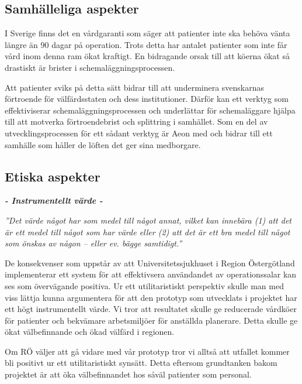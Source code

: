 \subsection{Samhälleliga aspekter}

I Sverige finns det en vårdgaranti som säger att patienter inte ska behöva vänta längre än 90 dagar på operation. Trots detta har antalet patienter som inte får vård inom denna ram ökat kraftigt. En bidragande orsak till att köerna ökat så drastiskt är brister i schemaläggningsprocessen. \cite{vardko}

Att patienter sviks på detta sätt bidrar till att underminera svenskarnas förtroende för välfärdsstaten och dess institutioner. Därför kan ett verktyg som effektiviserar schemaläggningsprocessen och underlättar för schemaläggare hjälpa till att motverka förtroendebrist och splittring i samhället. Som en del av utvecklingsprocessen för ett sådant verktyg är Aeon med och bidrar till ett samhälle som håller de löften det ger sina medborgare.

\subsection{Etiska aspekter}
\vspace{1em}
\begin{minipage}{1\linewidth}
\begin{center}
\textbf{\textit{- Instrumentellt värde -}}

\emph{''Det värde något har som medel till något annat, vilket kan innebära (1) att det är ett medel till något som har värde eller (2) att det är ett bra medel till något som önskas av någon – eller ev. bägge samtidigt.''} \cite{ne}

\end{center}
\end{minipage}

De konsekvenser som uppstår av att Universitetssjukhuset i Region Östergötland implementerar ett system för att effektivsera användandet av operationssalar kan ses som övervägande positiva. Ur ett utilitaristiskt perspektiv skulle man med viss lättja kunna argumentera för att den prototyp som utvecklats i projektet har ett högt instrumentellt värde. Vi tror att resultatet skulle ge reducerade vårdköer för patienter och bekvämare arbetsmiljöer för anställda planerare. Detta skulle ge ökat välbefinnande och ökad välfärd i regionen.

Om RÖ väljer att gå vidare med vår prototyp tror vi alltså att utfallet kommer bli positivt ur ett utilitaristiskt synsätt. Detta eftersom grundtanken bakom projektet är att öka välbefinnandet hos såväl patienter som personal.

